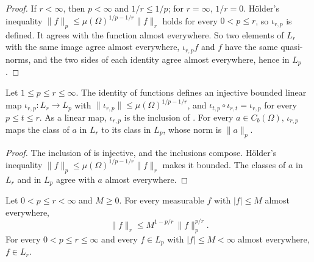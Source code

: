\begin{proof}
\leanok
If $r < \infty$, then $p < \infty$ and $1/r \leq 1/p$; for $r = \infty$, $1/r = 0$.
H\"older's inequality $\|f\|_p \leq \mu(\Omega)^{1/p - 1/r} \|f\|_r$ holds for every
$0 < p \leq r$, so $\iota_{r,p}$ is defined. It agrees with the function almost everywhere.
So two elements of $L_r$ with the same image agree almost everywhere, $\iota_{r,p} f$ and $f$
have the same quasi-norms, and the two sides of each identity agree almost everywhere, hence
in $L_p$.
\end{proof}

\begin{lemma}
\label{lem:inclusion}
\leanok
{}
Let $1 \leq p \leq r \leq \infty$. The identity of functions defines an injective bounded
linear map $\iota_{r,p} : L_r \to L_p$ with $\|\iota_{r,p}\| \leq
\mu(\Omega)^{1/p - 1/r}$, and $\iota_{t,p} \circ \iota_{r,t} = \iota_{r,p}$ for every
$p \leq t \leq r$. As a linear map, $\iota_{r,p}$ is the inclusion of
. For every $a \in C_b(\Omega)$, $\iota_{r,p}$ maps the class of $a$
in $L_r$ to its class in $L_p$, whose norm is $\|a\|_p$.
\end{lemma}

\begin{proof}
\leanok
The inclusion of  is injective, and the inclusions compose.
H\"older's inequality $\|f\|_p \leq \mu(\Omega)^{1/p - 1/r} \|f\|_r$ makes it bounded. The
classes of $a$ in $L_r$ and in $L_p$ agree with $a$ almost everywhere.
\end{proof}

\begin{lemma}
\label{lem:lp-interpolation}
\leanok
Let $0 < p \leq r < \infty$ and $M \geq 0$. For every measurable $f$ with $|f| \leq M$
almost everywhere,
\[
  \|f\|_r \leq M^{1 - p/r} \, \|f\|_p^{p/r} .
\]
For every $0 < p \leq r \leq \infty$ and every $f \in L_p$ with $|f| \leq M < \infty$ almost
everywhere, $f \in L_r$.
\end{lemma}

